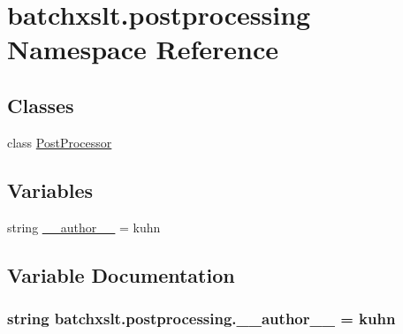 \hypertarget{namespacebatchxslt_1_1postprocessing}{}\section{batchxslt.\+postprocessing Namespace Reference}
\label{namespacebatchxslt_1_1postprocessing}
\subsection*{Classes}
\begin{DoxyCompactItemize}
\item 
class \hyperlink{classbatchxslt_1_1postprocessing_1_1_post_processor}{Post\+Processor}
\end{DoxyCompactItemize}
\subsection*{Variables}
\begin{DoxyCompactItemize}
\item 
string \hyperlink{namespacebatchxslt_1_1postprocessing_a685e76bf3c77d9ee1d93997b65387137}{\+\_\+\+\_\+author\+\_\+\+\_\+} = \textquotesingle{}kuhn\textquotesingle{}
\end{DoxyCompactItemize}


\subsection{Variable Documentation}
\hypertarget{namespacebatchxslt_1_1postprocessing_a685e76bf3c77d9ee1d93997b65387137}{}
\subsubsection[{\+\_\+\+\_\+author\+\_\+\+\_\+}]{\setlength{\rightskip}{0pt plus 5cm}string batchxslt.\+postprocessing.\+\_\+\+\_\+author\+\_\+\+\_\+ = \textquotesingle{}kuhn\textquotesingle{}}\label{namespacebatchxslt_1_1postprocessing_a685e76bf3c77d9ee1d93997b65387137}
